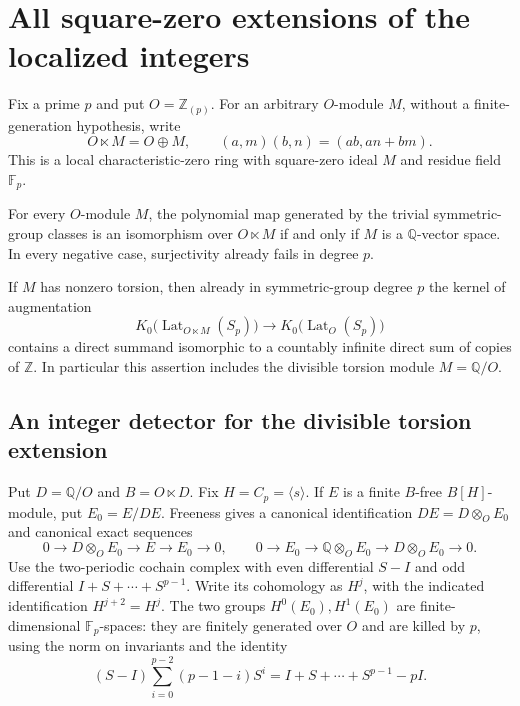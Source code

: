 \section{All square-zero extensions of the localized integers}
\label{sec:arbitrary-idealizations}

Fix a prime $p$ and put $O=\mathbb Z_{(p)}$.  For an arbitrary
$O$-module $M$, without a finite-generation hypothesis, write
\[
 O\ltimes M=O\oplus M,\qquad
 (a,m)(b,n)=(ab,an+bm).
\]
This is a local characteristic-zero ring with square-zero ideal $M$
and residue field $\mathbb F_p$.

\begin{theorem}\label{thm:arbitrary-idealizations}
For every $O$-module $M$, the polynomial map generated by the trivial
symmetric-group classes is an isomorphism over $O\ltimes M$ if and
only if $M$ is a $\mathbb Q$-vector space.  In every negative case,
surjectivity already fails in degree $p$.

If $M$ has nonzero torsion, then already in symmetric-group degree
$p$ the kernel of augmentation
\[
 K_0\bigl(\operatorname{Lat}_{O\ltimes M}(S_p)\bigr)
 \longrightarrow K_0\bigl(\operatorname{Lat}_{O}(S_p)\bigr)
\]
contains a direct summand isomorphic to a countably infinite direct
sum of copies of $\mathbb Z$.
In particular this assertion includes the divisible torsion module
$M=\mathbb Q/O$.
\end{theorem}

\subsection{An integer detector for the divisible torsion extension}

Put $D=\mathbb Q/O$ and $B=O\ltimes D$.  Fix
$H=C_p=\langle s\rangle$.  If $E$ is a finite $B$-free $B[H]$-module,
put $E_0=E/DE$.  Freeness gives a canonical identification
$DE=D\otimes_OE_0$ and canonical exact sequences
\begin{equation}\label{eq:divisible-two-extensions}
 0\longrightarrow D\otimes_OE_0\longrightarrow E\longrightarrow E_0
 \longrightarrow0,
 \qquad
 0\longrightarrow E_0\longrightarrow\mathbb Q\otimes_OE_0
 \longrightarrow D\otimes_OE_0\longrightarrow0.
\end{equation}
Use the two-periodic cochain complex with even differential $S-I$
and odd differential $I+S+\cdots+S^{p-1}$.  Write its cohomology as
$H^j$, with the indicated identification $H^{j+2}=H^j$.
The two groups $H^0(E_0),H^1(E_0)$ are finite-dimensional
$\mathbb F_p$-spaces: they are finitely generated over $O$ and are
killed by $p$, using the norm on invariants and the identity
\[
 (S-I)\sum_{i=0}^{p-2}(p-1-i)S^i
 =I+S+\cdots+S^{p-1}-pI.
\]

